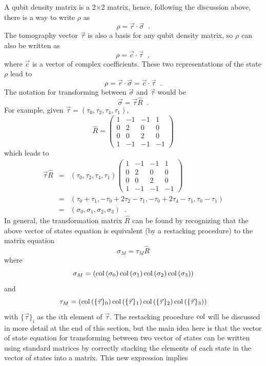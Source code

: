 A qubit density matrix is a 2$\times$2 matrix, hence, following the discussion above, there is a way to write $\rho$ as
$$
\rho = \vec{r}\cdot\vec{\sigma}\;\;.
$$
The tomography vector $\vec{\tau}$ is also a basis for any qubit density matrix, so $\rho$ can also be written as
$$
\rho = \vec{c}\cdot\vec{\tau}\;\;,
$$
where $\vec{c}$ is a vector of complex coefficients.  These two representations of the state $\rho$ lead to
$$
\rho = \vec{r}\cdot\vec{\sigma} = \vec{c}\cdot\vec{\tau}\;\;.
$$
The notation for transforming between $\vec{\sigma}$ and $\vec{\tau}$ would be
$$
\vec{\sigma} = \vec{\tau}\hat{R}\;\;.
$$
For example, given $\vec{\tau} = (\tau_0,\tau_2,\tau_4,\tau_1)$,
$$
\hat{R} = \begin{pmatrix}
1 & -1 & -1 & 1\\
0 & 2 & 0 & 0\\
0 & 0 & 2 & 0\\
1 & -1 & -1 & -1
\end{pmatrix}
$$
which leads to
\begin{eqnarray*}
\vec{\tau}\hat{R} &=& (\tau_0,\tau_2,\tau_4,\tau_1)\begin{pmatrix}
1 & -1 & -1 & 1\\
0 & 2 & 0 & 0\\
0 & 0 & 2 & 0\\
1 & -1 & -1 & -1
\end{pmatrix}\\
&=& (\tau_0+\tau_1,-\tau_0+2\tau_2-\tau_1,-\tau_0+2\tau_4-\tau_1,\tau_0-\tau_1)\\
&=& (\sigma_0,\sigma_1,\sigma_2,\sigma_3)\;\;.
\end{eqnarray*}
In general, the transformation matrix $\hat{R}$ can be found by recognizing that the above vector of states equation is equivalent (by a restacking procedure) to the matrix equation
$$
\sigma_M = \tau_M\hat{R}
$$
where 
$$
\sigma_M = \left( \operatorname{col}\left(\sigma_0\right) \operatorname{col}\left(\sigma_1\right) \operatorname{col}\left(\sigma_2\right) \operatorname{col}\left(\sigma_3\right)\right)
$$
and
$$
\tau_M = \left( \operatorname{col}\left(\{\vec{\tau}\}_0\right) \operatorname{col}\left(\{\vec{\tau}\}_1\right) \operatorname{col}\left(\{\vec{\tau}\}_2\right) \operatorname{col}\left(\{\vec{\tau}\}_3\right)\right)
$$
with $\{\vec{\tau}\}_i$ as the $i$th element of $\vec{\tau}$.  The restacking procedure $\operatorname{col}$ will be discussed in more detail at the end of this section, but the main idea here is that the vector of state equation for transforming between two vector of states can be written using standard matrices by correctly stacking the elements of each state in the vector of states into a matrix.  This new expression implies
